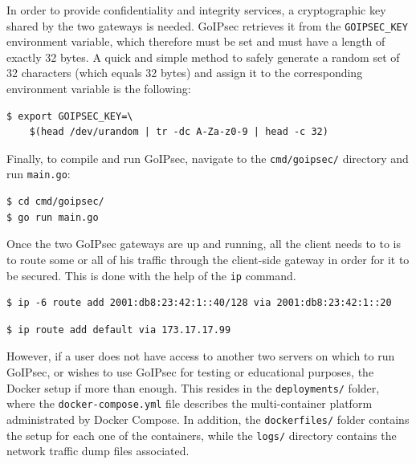 \documentclass[a4paper,12pt]{report}
\begin{document}
		
		In order to provide confidentiality and integrity services, a cryptographic key shared by the two gateways is needed. GoIPsec retrieves it from the \texttt{GOIPSEC\_KEY} environment variable, which therefore must be set and must have a length of exactly 32 bytes. A quick and simple method to safely generate a random set of 32 characters (which equals 32 bytes) and assign it to the corresponding environment variable is the following:
		\begin{lstlisting}[caption=Randomly generate \texttt{GOIPSEC\_KEY}.]
$ export GOIPSEC_KEY=\
	$(head /dev/urandom | tr -dc A-Za-z0-9 | head -c 32)
		\end{lstlisting}
		Finally, to compile and run GoIPsec, navigate to the \texttt{cmd/goipsec/} directory and run \texttt{main.go}:
		\begin{lstlisting}[caption=Compile and run GoIPsec.]
$ cd cmd/goipsec/
$ go run main.go
		\end{lstlisting}
		Once the two GoIPsec gateways are up and running, all the client needs to to is to route some or all of his traffic through the client-side gateway in order for it to be secured. This is done with the help of the \texttt{ip} command.
				\begin{lstlisting}[caption=Route IPv6 traffic destined for \texttt{2001:db8:23:42:1::40} through the GoIPsec gateway available at \texttt{2001:db8:23:42:1::20}.]
$ ip -6 route add 2001:db8:23:42:1::40/128 via 2001:db8:23:42:1::20
		\end{lstlisting}
\newpage
			\begin{lstlisting}[caption=Route all IPv4 traffic through the GoIPsec gateway with address \texttt{173.17.17.99}.]
$ ip route add default via 173.17.17.99
		\end{lstlisting}
		
		However, if a user does not have access to another two servers on which to run GoIPsec, or wishes to use GoIPsec for testing or educational purposes, the Docker setup if more than enough. This resides in the \texttt{deployments/} folder, where the \texttt{docker-compose.yml} file describes the multi-container platform administrated by Docker Compose. In addition, the \texttt{dockerfiles/} folder contains the setup for each one of the containers, while the \texttt{logs/} directory contains the network traffic dump files associated.
		
\end{document}
